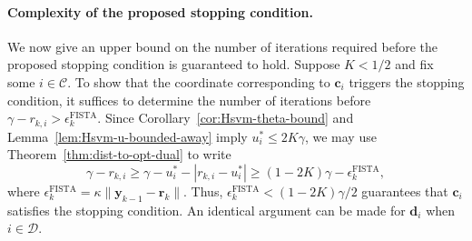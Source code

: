 \documentclass[twoside,11pt]{article}
\renewcommand{\c}{\bm{c}}
\renewcommand{\d}{\bm{d}}
\renewcommand\r{\bm{r}}
\newcommand\y{\bm{y}}
\newcommand\CC{\mathcal{C}}
\newcommand\DD{\mathcal{D}}
\newcommand\FISTA{\mathrm{FISTA}}
\begin{document}
\paragraph{Complexity of the proposed stopping condition.}
We now give an upper bound on the number of iterations required before the proposed stopping condition is guaranteed to hold. Suppose $K < 1/2$ and fix some $i \in \CC$. To show that the coordinate corresponding to $\c_i$ triggers the stopping condition, it suffices to determine the number of iterations before $\gamma - r_{k,i} > \epsilon_k^{\FISTA}$.
Since Corollary~\ref{cor:Hsvm-theta-bound} and Lemma~\ref{lem:Hsvm-u-bounded-away} imply $u_i^* \leq 2K\gamma$, we may use Theorem~\ref{thm:dist-to-opt-dual} to write
\[
    \gamma - r_{k,i} \geq \gamma - u_i^* - |r_{k,i} - u_i^*| \geq (1-2K)\gamma - \epsilon_k^{\FISTA},
\]
where $\epsilon_k^{\FISTA} = \kappa\|\y_{k-1} - \r_k\|$. Thus, $\epsilon_k^{\FISTA} < (1-2K)\gamma/2$ guarantees that $\c_i$ satisfies the stopping condition. An identical argument can be made for $\d_i$ when $i \in \DD$.
\end{document}
